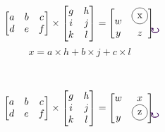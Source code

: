 \documentclass{article}
\newcommand{\tikzmark}[1]{\tikz[overlay,remember picture] \node (#1) {};}
\begin{document}
\[
\begin{bmatrix}
    \tikzmark{a}a  &  \tikzmark{c}b & \tikzmark{e}c      \\
    d  &  e & f      
\end{bmatrix}
\times
\begin{bmatrix}
    g & \tikzmark{b} h      \\
    i  &  \tikzmark{d}j        \\
    k  &  \tikzmark{f}l
\end{bmatrix}
=
\begin{bmatrix}
    w  & \tikz \node[draw,circle]{x};      \\
    y  &  z
\end{bmatrix}
\\
\\
\begin{tikzpicture}[overlay,remember picture,out=315,in=225,distance=0.4cm]
    \draw[->,red,shorten >=3pt,shorten <=3pt] (a.center) to (b.center);
	\draw[->,blue,shorten >=3pt,shorten <=3pt] (c.center) to (d.center);
	\draw[->,black,shorten >=3pt,shorten <=3pt] (e.center) to (f.center);
\end{tikzpicture}
\]
\begin{equation}
x= a \times h + b \times j + c \times l
\end{equation}
\\
\\
\[
\begin{bmatrix}
    a  &  b & c      \\
    \tikzmark{a}d  &  \tikzmark{c}e & \tikzmark{e}f      
\end{bmatrix}
\times
\begin{bmatrix}
    g & \tikzmark{b} h      \\
    i  &  \tikzmark{d}j        \\
    k  &  \tikzmark{f}l
\end{bmatrix}
=
\begin{bmatrix}
    w  & x      \\
    y  &  \tikz \node[draw,circle]{z};
\end{bmatrix}
\\
\\
\begin{tikzpicture}[overlay,remember picture,out=315,in=225,distance=0.4cm]
    \draw[->,red,shorten >=3pt,shorten <=3pt] (a.center) to (b.center);
	\draw[->,blue,shorten >=3pt,shorten <=3pt] (c.center) to (d.center);
	\draw[->,black,shorten >=3pt,shorten <=3pt] (e.center) to (f.center);
\end{tikzpicture}
\]
\end{document}
